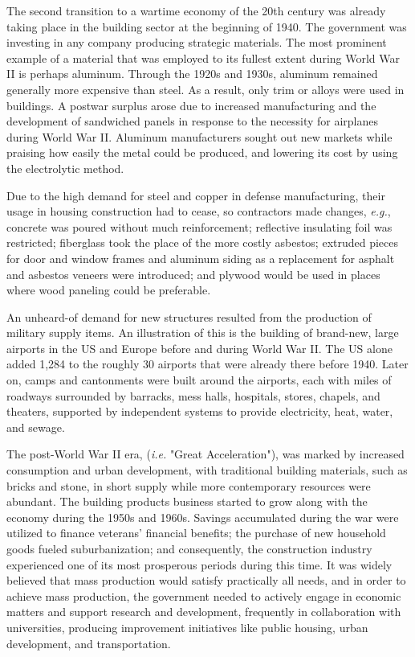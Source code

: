 The second transition to a wartime economy of the 20th century was already taking place in the building sector at the beginning of 1940. The government was investing in any company producing strategic materials.\autocite{krausmann2009growth} The most prominent example of a material that was employed to its fullest extent during World War II is perhaps aluminum.\autocite{jester2014twentieth} Through the 1920s and 1930s, aluminum remained generally more expensive than steel. As a result, only trim or alloys were used in buildings. A postwar surplus arose due to increased manufacturing and the development of sandwiched panels in response to the necessity for airplanes during World War II. Aluminum manufacturers sought out new markets while praising how easily the metal could be produced, and lowering its cost by using the electrolytic method.\autocite{laffarga1997resena}

Due to the high demand for steel and copper in defense manufacturing, their usage in housing construction had to cease, so contractors made changes, \textit{e.g.}, concrete was poured without much reinforcement; reflective insulating foil was restricted; fiberglass took the place of the more costly asbestos; extruded pieces for door and window frames and aluminum siding as a replacement for asphalt and asbestos veneers were introduced; and plywood would be used in places where wood paneling could be preferable.\autocite{jester2014twentieth}

An unheard-of demand for new structures resulted from the production of military supply items. An illustration of this is the building of brand-new, large airports in the US and Europe before and during World War II.\autocite{bonnefoy2008scalability} The US alone added 1,284 to the roughly 30 airports that were already there before 1940.\autocite{jester2014twentieth} Later on, camps and cantonments were built around the airports, each with miles of roadways surrounded by barracks, mess halls, hospitals, stores, chapels, and theaters, supported by independent systems to provide electricity, heat, water, and sewage.\autocite{sill1947american}

The post-World War II era, (\textit{i.e.} "Great Acceleration"), was marked by increased consumption and urban development, with traditional building materials, such as bricks and stone, in short supply while more contemporary resources were abundant.\autocite{elhacham2020global} The building products business started to grow along with the economy during the 1950s and 1960s.\autocite{agueda2016historia} Savings accumulated during the war were utilized to finance veterans' financial benefits; the purchase of new household goods fueled suburbanization; and consequently, the construction industry experienced one of its most prosperous periods during this time.\autocite{jester2014twentieth} It was widely believed that mass production would satisfy practically all needs, and in order to achieve mass production, the government needed to actively engage in economic matters and support research and development, frequently in collaboration with universities, producing improvement initiatives like public housing, urban development, and transportation.\autocite{harwood1969emergence}

